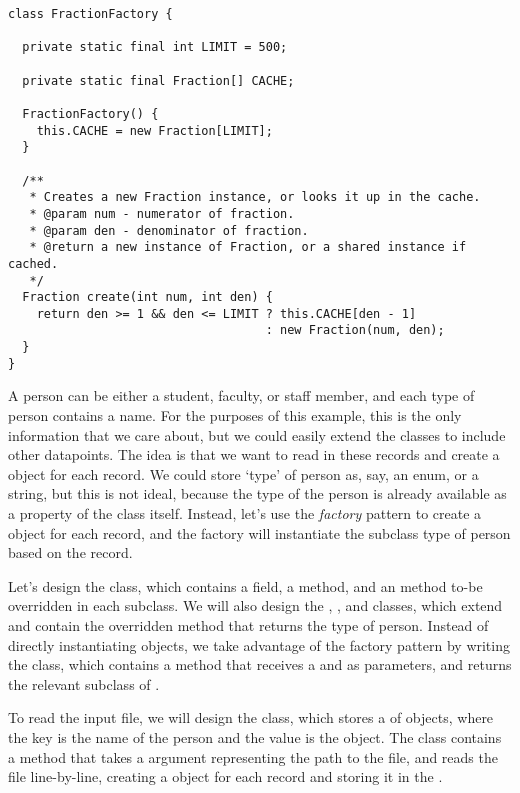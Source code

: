 \begin{lstlisting}[language=MyJava]
class FractionFactory {

  private static final int LIMIT = 500;
  
  private static final Fraction[] CACHE;

  FractionFactory() {
    this.CACHE = new Fraction[LIMIT];
  }

  /**
   * Creates a new Fraction instance, or looks it up in the cache.
   * @param num - numerator of fraction.
   * @param den - denominator of fraction.
   * @return a new instance of Fraction, or a shared instance if cached.
   */
  Fraction create(int num, int den) {
    return den >= 1 && den <= LIMIT ? this.CACHE[den - 1] 
                                    : new Fraction(num, den);
  }
}
\end{lstlisting}

A person can be either a student, faculty, or staff member, and each type of person contains a name. 
For the purposes of this example, this is the only information that we care about, but we could easily extend the classes to include other datapoints. 
The idea is that we want to read in these records and create a  object for each record. 
We could store `type' of person as, say, an enum, or a string, but this is not ideal, because the type of the person is already available as a property of the class itself. 
Instead, let's use the \emph{factory} pattern to create a  object for each record, and the factory will instantiate the subclass type of person based on the record.

Let's design the   class, which contains a  field, a  method, and an   method to-be overridden in each subclass. 
We will also design the , , and  classes, which extend  and contain the overridden  method that returns the type of person. 
Instead of directly instantiating  objects, we take advantage of the factory pattern by writing the  class, which contains a  method that receives a  and  as parameters, and returns the relevant subclass of .

To read the input file, we will design the  class, which stores a  of  objects, where the key is the name of the person and the value is the  object. 
The  class contains a  method that takes a  argument representing the path to the file, and reads the file line-by-line, creating a  object for each record and storing it in the .

